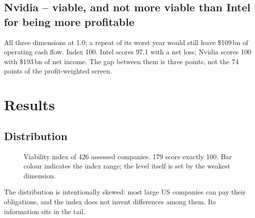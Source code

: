 \documentclass[11pt,a4paper]{article}
\begin{document}
\subsection{Nvidia -- viable, and not more viable than Intel for being more profitable}
All three dimensions at 1.0; a repeat of its worst year would still leave \$109\,bn of operating cash flow. Index 100. Intel scores 97.1 with a net loss; Nvidia scores 100 with \$193\,bn of net income. The gap between them is three points, not the 74 points of the profit-weighted screen.

\section{Results}

\subsection{Distribution}
\begin{figure}[!htbp]
\centering
{}
\caption{Viability index of 426 assessed companies. 179 score exactly 100. Bar colour indicates the index range; the level itself is set by the weakest dimension.}
\end{figure}

The distribution is intentionally skewed: most large US companies can pay their obligations, and the index does not invent differences among them. Its information sits in the tail.
\end{document}
